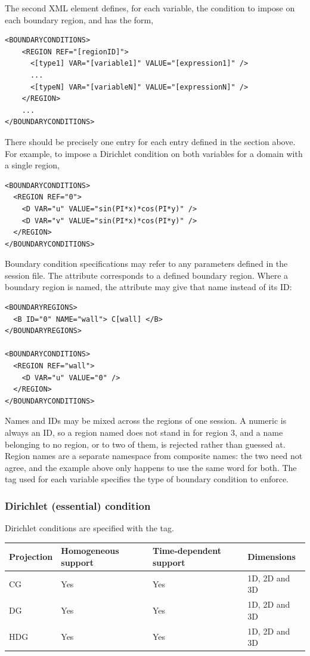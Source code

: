 The second XML element defines, for each variable, the condition to impose on
each boundary region, and has the form,
\begin{lstlisting}[style=XMLStyle]
<BOUNDARYCONDITIONS>
    <REGION REF="[regionID]">
      <[type1] VAR="[variable1]" VALUE="[expression1]" />
      ...
      <[typeN] VAR="[variableN]" VALUE="[expressionN]" />
    </REGION>
    ...
</BOUNDARYCONDITIONS>
\end{lstlisting}
There should be precisely one  entry for each  entry
defined in the  section above. For example, to impose a
Dirichlet condition on both variables for a domain with a single region, 
\begin{lstlisting}[style=XMLStyle] 
<BOUNDARYCONDITIONS>
  <REGION REF="0">
    <D VAR="u" VALUE="sin(PI*x)*cos(PI*y)" /> 
    <D VAR="v" VALUE="sin(PI*x)*cos(PI*y)" />
  </REGION>
</BOUNDARYCONDITIONS>
\end{lstlisting}
Boundary condition specifications may refer to any parameters defined in the
session file. The  attribute corresponds to a defined boundary
region. Where a boundary region is named, the  attribute may
give that name instead of its ID:
\begin{lstlisting}[style=XMLStyle]
<BOUNDARYREGIONS>
  <B ID="0" NAME="wall"> C[wall] </B>
</BOUNDARYREGIONS>

<BOUNDARYCONDITIONS>
  <REGION REF="wall">
    <D VAR="u" VALUE="0" />
  </REGION>
</BOUNDARYCONDITIONS>
\end{lstlisting}
Names and IDs may be mixed across the regions of one session. A numeric
 is always an ID, so a region named  does not stand in for
region 3, and a name belonging to no region, or to two of them, is rejected
rather than guessed at. Region names are a separate namespace from composite
names: the two need not agree, and the example above only happens to use the
same word for both. The tag used for each variable specifies the type of boundary condition
to enforce.

\subsubsection{Dirichlet (essential) condition}
Dirichlet conditions are specified with the  tag.

\begin{tabular}{llll}
Projection & Homogeneous support & Time-dependent support & Dimensions \\
\toprule
CG & Yes & Yes & 1D, 2D and 3D \\
DG & Yes & Yes & 1D, 2D and 3D \\
HDG& Yes & Yes & 1D, 2D and 3D
\end{tabular}

